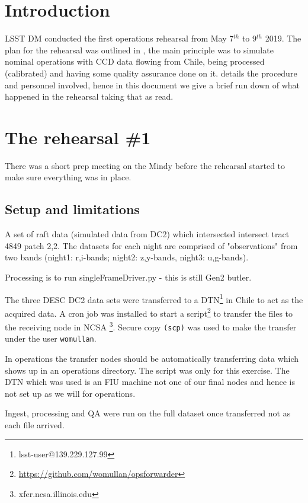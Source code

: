 \section{Introduction} \label{sec:intro}

LSST \gls{DM} conducted the first operations rehearsal from May 7$^{th}$ to 9$^{th}$ 2019.
The plan for the rehearsal was outlined in , the main principle was to simulate
nominal operations with \gls{CCD} data flowing from Chile, being processed (calibrated) and having some quality
assurance done on it.
 details the procedure and personnel involved,
hence in this document  we give a brief run down of what  happened in the rehearsal taking that as read.


\section{The rehearsal \#1}

There was a short prep meeting on the Mindy before the rehearsal started to make sure everything was in place.
\subsection{Setup and limitations} \label{sec:setup}



A set of raft data (simulated data from DC2) which intersected
intersect tract 4849 patch 2,2.  The datasets for each night are comprised
of "observations" from two bands (night1: r,i-bands;  night2: z,y-bands, night3: u,g-bands).

Processing is to run singleFrameDriver.py - this is still Gen2 butler.

The three \gls{DESC} DC2 data sets were transferred to a DTN\footnote{lsst-user@139.229.127.99} in Chile to act as the acquired data.
A cron job was installed to start a script\footnote{\url{https://github.com/womullan/opsforwarder}} to transfer the files to the receiving node in \gls{NCSA} \footnote{xfer.ncsa.illinois.edu}. Secure copy \texttt{(scp)}  was used to make the transfer under the user \texttt{womullan}.

In operations the transfer nodes should be automatically transferring data which shows up in an operations directory. The script was only for this exercise. The \gls{DTN} which was used is an \gls{FIU} machine not one of our final nodes and hence is not set up as we will for operations.

Ingest, processing and \gls{QA} were run on the full dataset once transferred not as each file arrived.

